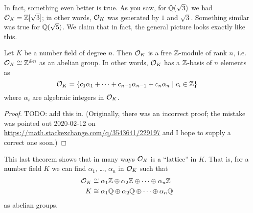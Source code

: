 In fact, something even better is true.
As you saw, for $\mathbb Q(\sqrt 3)$ we had $\mathcal O_K = \mathbb Z[\sqrt 3]$;
in other words, $\mathcal O_K$ was generated by $1$ and $\sqrt 3$.
Something similar was true for $\mathbb Q(\sqrt 5)$.
We claim that in fact, the general picture looks exactly like this.

\begin{theorem}
	Let $K$ be a number field of degree $n$.
	Then $\mathcal O_K$ is a free $\mathbb Z$-module of rank $n$,
	i.e.\ $\mathcal O_K \cong \mathbb Z^{\oplus n}$ as an abelian group.
	In other words, $\mathcal O_K$ has a $\mathbb Z$-basis of $n$ elements as
	\[ \mathcal O_K = \left\{ c_1\alpha_1 + \dots
			+ c_{n-1}\alpha_{n-1} + c_n\alpha_n \mid c_i \in \mathbb Z \right\} \]
	where $\alpha_i$ are algebraic integers in $\mathcal O_K$.
	\label{thm:OK_free_Z_module}
\end{theorem}

\begin{proof}
	TODO: add this in.
	(Originally, there was an incorrect proof;
	the mistake was pointed out 2020-02-12 on
	\url{https://math.stackexchange.com/q/3543641/229197}
	and I hope to supply a correct one soon.)
%
%
%
\end{proof}

This last theorem shows that in many ways $\mathcal O_K$ is a ``lattice'' in $K$.
That is, for a number field $K$ we can find $\alpha_1$, \dots, $\alpha_n$
in $\mathcal O_K$ such that
\begin{align*}
	\mathcal O_K &\cong \alpha_1\mathbb Z \oplus \alpha_2\mathbb Z \oplus \dots \oplus \alpha_n\mathbb Z \\
	K &\cong \alpha_1\mathbb Q \oplus \alpha_2\mathbb Q \oplus \dots \oplus \alpha_n\mathbb Q
\end{align*}
as abelian groups.

